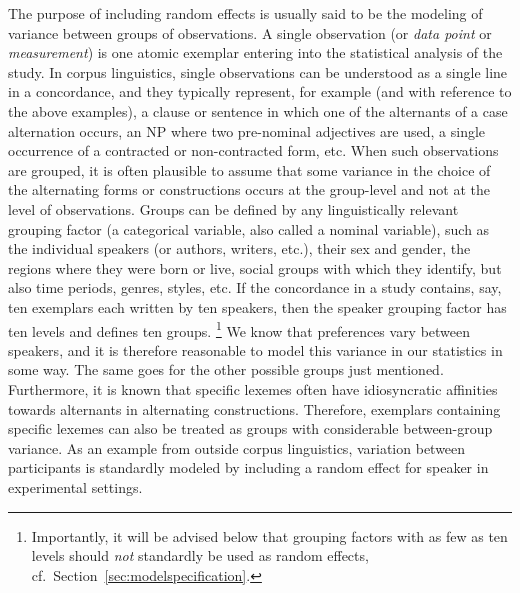 \documentclass[a4paper,12pt]{article}
\begin{document}
The purpose of including random effects is usually said to be the modeling of variance between groups of observations.
A single observation (or \textit{data point} or \textit{measurement}) is one atomic exemplar entering into the statistical analysis of the study.
In corpus linguistics, single observations can be understood as a single line in a concordance, and they typically represent, for example (and with reference to the above examples), a clause or sentence in which one of the alternants of a case alternation occurs, an NP where two pre-nominal adjectives are used, a single occurrence of a contracted or non-contracted form, etc.
When such observations are grouped, it is often plausible to assume that some variance in the choice of the alternating forms or constructions occurs at the group-level and not at the level of observations.
Groups can be defined by any linguistically relevant grouping factor (a categorical variable, also called a nominal variable), such as the individual speakers (or authors, writers, etc.), their sex and gender, the regions where they were born or live, social groups with which they identify, but also time periods, genres, styles, etc.
If the concordance in a study contains, say, ten exemplars each written by ten speakers, then the speaker grouping factor has ten levels and defines ten groups.%
\footnote{Importantly, it will be advised below that grouping factors with as few as ten levels should \textit{not} standardly be used as random effects, cf.\ Section~\ref{sec:modelspecification}.}
We know that preferences vary between speakers, and it is therefore reasonable to model this variance in our statistics in some way.
The same goes for the other possible groups just mentioned.
Furthermore, it is known that specific lexemes often have idiosyncratic affinities towards alternants in alternating constructions.
Therefore, exemplars containing specific lexemes can also be treated as groups with considerable between-group variance.
As an example from outside corpus linguistics, variation between participants is standardly modeled by including a random effect for speaker in experimental settings.
\end{document}
